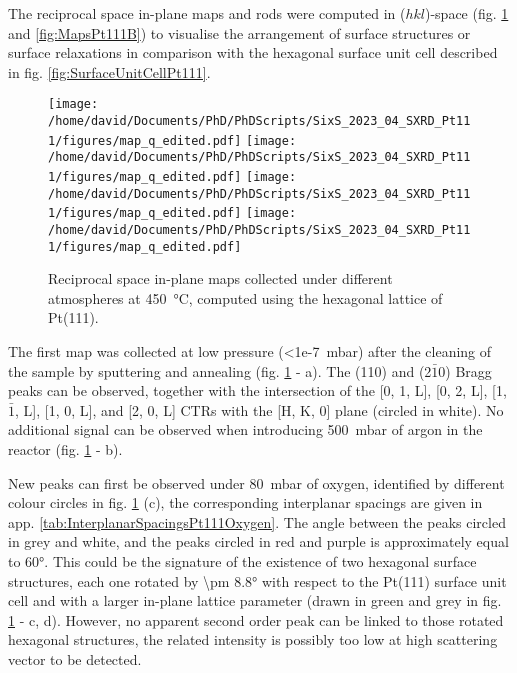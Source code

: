 The reciprocal space in-plane maps and rods were computed in ($hkl$)-space (fig. \ref{fig:MapsPt111A} and \ref{fig:MapsPt111B}) to visualise the arrangement of surface structures or surface relaxations in comparison with the hexagonal surface unit cell described in fig. \ref{fig:SurfaceUnitCellPt111}.

\begin{figure}[!htb]
    \centering
    \texttt{[image: /home/david/Documents/PhD/PhDScripts/SixS\_2023\_04\_SXRD\_Pt111/figures/map\_q\_edited.pdf]}
    \texttt{[image: /home/david/Documents/PhD/PhDScripts/SixS\_2023\_04\_SXRD\_Pt111/figures/map\_q\_edited.pdf]}
    \texttt{[image: /home/david/Documents/PhD/PhDScripts/SixS\_2023\_04\_SXRD\_Pt111/figures/map\_q\_edited.pdf]}
    \texttt{[image: /home/david/Documents/PhD/PhDScripts/SixS\_2023\_04\_SXRD\_Pt111/figures/map\_q\_edited.pdf]}
    \caption{
        Reciprocal space in-plane maps collected under different atmospheres at \qty{450}{\degreeCelsius}, computed using the hexagonal lattice of Pt(111).
    }
    \label{fig:MapsPt111A}
\end{figure}

The first map was collected at low pressure (\qty{<1e-7}{\milli\bar}) after the cleaning of the sample by sputtering and annealing (fig. \ref{fig:MapsPt111A} - a).
The (110) and (2$\bar{1}$0) Bragg peaks can be observed, together with the intersection of the [0, 1, L], [0, 2, L], [1, $\bar{1}$, L], [1, 0, L], and [2, 0, L] CTRs with the [H, K, 0] plane (circled in white).
No additional signal can be observed when introducing \qty{500}{\milli\bar} of argon in the reactor (fig. \ref{fig:MapsPt111A} - b).

New peaks can first be observed under \qty{80}{\milli\bar} of oxygen, identified by different colour circles in fig. \ref{fig:MapsPt111A} (c), the corresponding interplanar spacings are given in app. \ref{tab:InterplanarSpacingsPt111Oxygen}.
The angle between the peaks circled in grey and white, and the peaks circled in red and purple is approximately equal to \ang{60}.
This could be the signature of the existence of two hexagonal surface structures, each one rotated by \ang{\pm 8.8} with respect to the Pt(111) surface unit cell and with a larger in-plane lattice parameter (drawn in green and grey in fig. \ref{fig:MapsPt111A} - c, d).
However, no apparent second order peak can be linked to those rotated hexagonal structures, the related intensity is possibly too low at high scattering vector to be detected.

